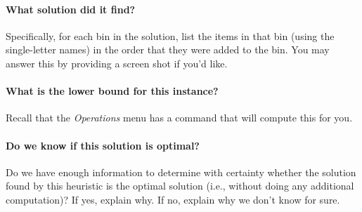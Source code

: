 \documentclass[11pt,letterpaper]{article}
\begin{document}
\paragraph*{What solution did it find?} Specifically, for each bin in the
solution, list the items in that bin (using the single-letter names) in the
order that they were added to the bin. You may answer this by providing a
screen shot if you'd like.

\vspace*{2in}

\paragraph*{What is the lower bound for this instance?} Recall that the
{\em Operations} menu has a command that will compute this for you.

\vspace*{0.25in}

\paragraph*{Do we know if this solution is optimal?} Do we have enough 
information to determine with certainty whether the solution found by
this heuristic is the optimal solution (i.e., without doing any additional
computation)? If yes, explain why. If no, explain why we don't know for sure.

\vspace*{1in}
\end{document}
